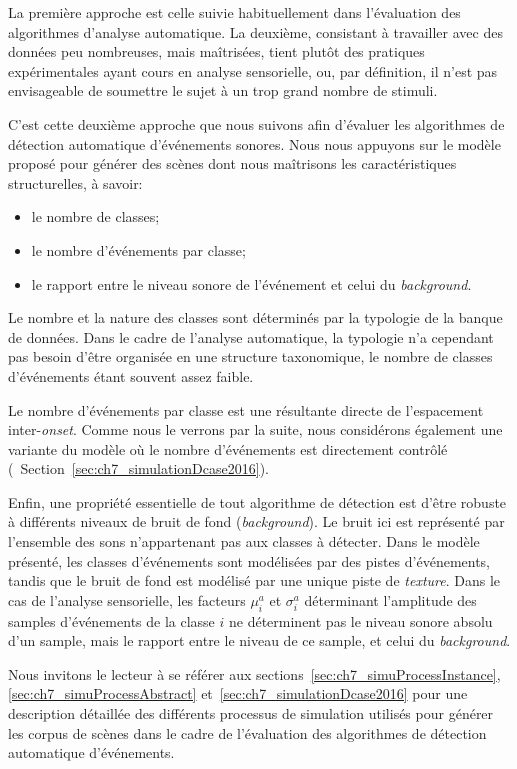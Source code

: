 La première approche est celle suivie habituellement dans l'évaluation des algorithmes d'analyse automatique. La deuxième, consistant à travailler avec des données peu nombreuses, mais maîtrisées, tient plutôt des pratiques expérimentales ayant cours en analyse sensorielle, ou, par définition, il n'est pas envisageable de soumettre le sujet à un trop grand nombre de stimuli.

C'est cette deuxième approche que nous suivons afin d'évaluer les algorithmes de détection automatique d'événements sonores. Nous nous appuyons sur le modèle proposé pour générer des scènes dont nous maîtrisons les caractéristiques structurelles, à savoir:

\begin{itemize}
\item le nombre de classes;
\item le nombre d'événements par classe;
\item le rapport entre le niveau sonore de l'événement et celui du \emph{background}. 
\end{itemize}

Le nombre et la nature des classes sont déterminés par la typologie de la banque de données. Dans le cadre de l'analyse automatique, la typologie n'a cependant pas besoin d'être organisée en une structure taxonomique, le nombre de classes d'événements étant souvent assez faible.

Le nombre d'événements par classe est une résultante directe de l'espacement inter-\emph{onset}. Comme nous le verrons par la suite, nous considérons également une variante du modèle où le nombre d'événements est directement contrôlé (\cf~Section~\ref{sec:ch7_simulationDcase2016}).

Enfin, une propriété essentielle de tout algorithme de détection est d'être robuste à différents niveaux de bruit de fond (\emph{background}). Le bruit ici est représenté par l'ensemble des sons n'appartenant pas aux classes à détecter. Dans le modèle présenté, les classes d'événements sont modélisées par des pistes d'événements, tandis que le bruit de fond est modélisé par une unique piste de \emph{texture}. Dans le cas de l'analyse sensorielle, les facteurs $\mu^a_i$ et $\sigma^a_i$ déterminant l'amplitude des samples d'événements de la classe $i$ ne déterminent pas le niveau sonore absolu d'un sample, mais le rapport entre le niveau de ce sample, et celui du \emph{background}.

Nous invitons le lecteur à se référer aux sections~\ref{sec:ch7_simuProcessInstance}, \ref{sec:ch7_simuProcessAbstract} et~\ref{sec:ch7_simulationDcase2016} pour une description détaillée des différents processus de simulation utilisés pour générer les corpus de scènes dans le cadre de l'évaluation des algorithmes de détection automatique d'événements.

